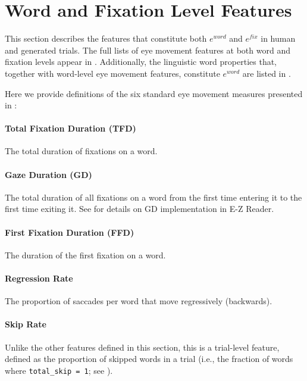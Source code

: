 
\appendix


\section{Word and Fixation Level Features}
\label{app:word_fix_level_features}

This section describes the features that constitute both \( e^{word} \) and \( e^{fix} \) in human and generated trials. The full lists of eye movement features at both word and fixation levels appear in . Additionally, the linguistic word properties that, together with word-level eye movement features, constitute \( e^{word} \) are listed in .

Here we provide definitions of the six standard eye movement measures presented in :

\paragraph{Total Fixation Duration (TFD)} The total duration of fixations on a word.

\paragraph{Gaze Duration (GD)} The total duration of all fixations on a word from the first time entering it to the first time exiting it. See  for details on GD implementation in \mbox{E-Z} Reader.

\paragraph{First Fixation Duration (FFD)} The duration of the first fixation on a word.

\paragraph{Regression Rate} The proportion of saccades per word that move regressively (backwards).

\paragraph{Skip Rate} Unlike the other features defined in this section, this is a trial-level feature, defined as the proportion of skipped words in a trial (i.e., the fraction of words where \texttt{total\_skip = 1}; see ).

